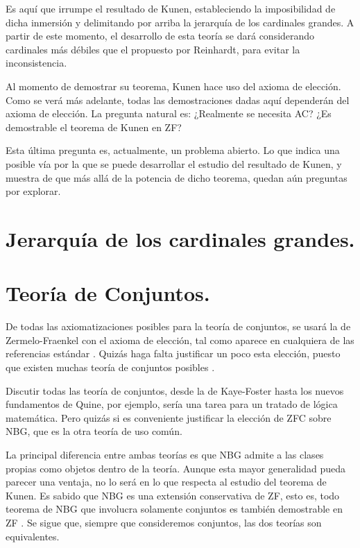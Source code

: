 Es aquí que irrumpe el resultado de Kunen,
estableciendo la imposibilidad de dicha inmersión
y delimitando por arriba la jerarquía de los cardinales
grandes. A partir de este momento, el desarrollo
de esta teoría se dará considerando cardinales más
débiles que el propuesto por Reinhardt,
para evitar la inconsistencia.

Al momento de demostrar su teorema, Kunen hace
uso del axioma de elección. Como se verá
más adelante, todas las demostraciones dadas aquí
dependerán del axioma de elección.
La pregunta natural es: ¿Realmente se necesita AC?
¿Es demostrable el teorema de Kunen en ZF?

Esta última pregunta es, actualmente, un problema abierto.
Lo que indica una posible vía por la que se puede desarrollar
el estudio del resultado de Kunen, y muestra de que más allá
de la potencia de dicho teorema, quedan aún preguntas por explorar.

\section*{Jerarquía de los cardinales grandes.}

\section*{Teoría de Conjuntos.}

De todas las axiomatizaciones posibles para la teoría de conjuntos,
se usará la de Zermelo-Fraenkel con el axioma de elección, tal como
aparece en cualquiera de las referencias estándar
\autocite{kunen_set_2013,jech_set_2003}. Quizás haga falta justificar un poco
esta elección, puesto que existen muchas teoría de conjuntos posibles \autocite{ivorra_teorias_2013}.

Discutir todas las teoría de conjuntos, desde la de Kaye-Foster hasta los nuevos fundamentos
de Quine, por ejemplo, sería una tarea para un tratado de lógica matemática.
Pero quizás si es conveniente justificar la elección de ZFC sobre NBG, que es
la otra teoría de uso común.

La principal diferencia entre ambas teorías es que NBG admite a las clases propias
como objetos dentro de la teoría. Aunque esta mayor generalidad pueda parecer una ventaja,
no lo será en lo que respecta al estudio del teorema de Kunen.
Es sabido que NBG es una extensión conservativa de ZF,
esto es, todo teorema de NBG que involucra solamente conjuntos es también demostrable en ZF
\autocite[pág. 70]{jech_set_2003}.
Se sigue que, siempre que consideremos conjuntos, las dos teorías son equivalentes.

